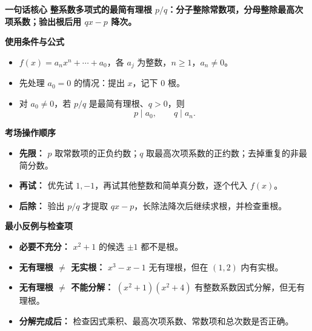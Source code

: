 \begin{summarybox}
    \textbf{\textcolor{CSummary}{一句话核心}}
    \textbf{整系数多项式的最简有理根 $p/q$：分子整除常数项，分母整除最高次项系数；验出根后用 $qx-p$ 降次。}

    \medskip
    \textbf{\textcolor{CSummary}{使用条件与公式}}
    \begin{itemize}[leftmargin=*, itemsep=0.48em, topsep=0.35em]
        \item $f(x)=a_nx^n+\cdots+a_0$，各 $a_j$ 为整数，$n\ge1$，$a_n\ne0$。
        \item 先处理 $a_0=0$ 的情况：提出 $x$，记下 $0$ 根。
        \item 对 $a_0\ne0$，若 $p/q$ 是最简有理根、$q>0$，则
            \[
                \boxed{p\mid a_0,\qquad q\mid a_n.}
            \]
    \end{itemize}

    \medskip
    \textbf{\textcolor{CSummary}{考场操作顺序}}
    \begin{itemize}[leftmargin=*, itemsep=0.45em, topsep=0.35em]
        \item \textbf{先限：} $p$ 取常数项的正负约数；$q$ 取最高次项系数的正约数；去掉重复的非最简分数。
        \item \textbf{再试：} 优先试 $1,-1$，再试其他整数和简单真分数，逐个代入 $f(x)$。
        \item \textbf{后除：} 验出 $p/q$ 才提取 $qx-p$，长除法降次后继续求根，并检查重根。
    \end{itemize}

    \medskip
    \textbf{\textcolor{CSummary}{最小反例与检查项}}
    \begin{itemize}[leftmargin=*, itemsep=0.45em, topsep=0.35em]
        \item \textbf{必要不充分：} $x^2+1$ 的候选 $\pm1$ 都不是根。
        \item \textbf{无有理根 $\ne$ 无实根：} $x^3-x-1$ 无有理根，但在 $(1,2)$ 内有实根。
        \item \textbf{无有理根 $\ne$ 不能分解：} $(x^2+1)(x^2+4)$ 有整数系数因式分解，但无有理根。
        \item \textbf{分解完成后：} 检查因式乘积、最高次项系数、常数项和总次数是否正确。
    \end{itemize}
\end{summarybox}
